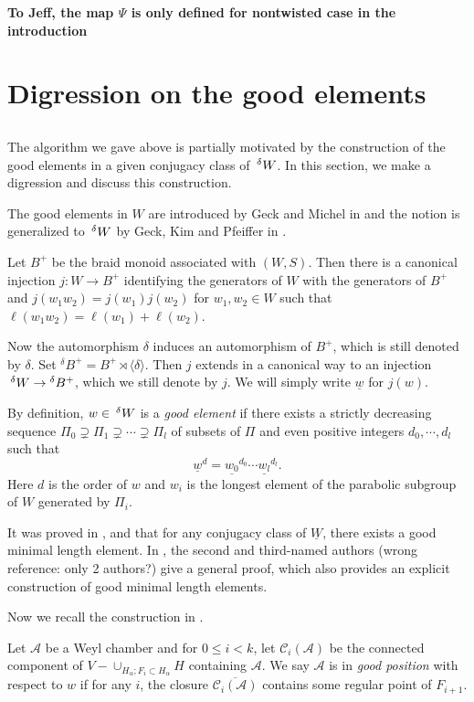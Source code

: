 \documentclass[12pt,leqno]{article}
\newcommand{\caC}{\mathcal C}
\newcommand{\caA}{\mathcal A}
\renewcommand{\a}{\mathfrak a}
\renewcommand{\sec}[1]{\section{#1}
\renewcommand{\theequation}{\thesection.\arabic{equation}}
  \setcounter{equation}{0}}
\newcommand{\Wext}{\negthinspace\negthinspace\phantom{a}^\delta W}
\def\le{\leqslant}
\def\a{\alpha}
\renewcommand{\sec}[1]{\section{#1}
\renewcommand{\theequation}{\thesection.\arabic{equation}}
  \setcounter{equation}{0}}
\begin{document}
{\bf To Jeff, the map $\Psi$ is only defined for nontwisted case in the introduction}

\sec{Digression on the good elements}

\subsection{} The algorithm we gave above is partially motivated by
the construction of the good elements in a given conjugacy class of
$\Wext$. In this section, we make a digression and discuss this
construction.

The good elements in $W$ are introduced by Geck and Michel in
\cite{geck_michel_good} and the notion is generalized to $\Wext$ by Geck, Kim and
Pfeiffer in \cite{gkp}.

Let $B^+$ be the braid monoid associated with $(W,S)$. Then there is a
canonical injection $j:W\longrightarrow B^+$ identifying the
generators of $W$ with the generators of $B^+$ and
$j(w_1w_2)=j(w_1)j(w_2)$ for $w_1,w_2\in W$ such that
$\ell(w_1w_2)=\ell(w_1)+\ell(w_2)$.

Now the automorphism $\delta$ induces an automorphism of $B^+$, which
is still denoted by $\delta$. Set ${}^{\delta} B^+=B^+ \rtimes
\langle\delta\rangle$. Then $j$ extends in a canonical way to an
injection $\Wext \to {}^{\delta} B^+$, which we still denote by
$j$. We will simply write $\underline w$ for $j(w)$.

By definition, $w \in \Wext$ is a {\it good element} if there exists a
strictly decreasing sequence $\Pi_0 \supsetneq \Pi_1 \supsetneq \cdots
\supsetneq \Pi_l$ of subsets of $\Pi$ and even positive integers
$d_0,\cdots,d_l$ such
that $${\underline{w}}^d=\underline{w_0}^{d_0}\cdots\underline{w_l}^{d_l}.$$
Here $d$ is the order of $w$ and $w_i$ is the longest element of the
parabolic subgroup of $W$ generated by $\Pi_i$.

It was proved in \cite{geck_michel_good}, \cite{gkp} and \cite{he_minimal_length_double_cosets} that for any
conjugacy class of $\underline W$, there exists a good minimal length
element. In \cite{he_nie_minimal_finite}, the second and third-named authors  
(wrong reference: only 2 authors?) give a
general proof, which also provides an explicit construction of good
minimal length elements.

Now we recall the construction in \cite{he_nie_minimal_finite}.

Let $\caA$ be a Weyl chamber and for $0 \le i < k$, let $\caC_i(\caA)$
be the connected component of $V-\cup_{H_\a; F_i \subset H_\a}H$
containing $\caA$. We say $\caA$ is in {\it good position} with
respect to $w$ if for any $i$, the closure $\overline{\caC_i(\caA)}$
contains some regular point of $F_{i+1}$.
\end{document}
